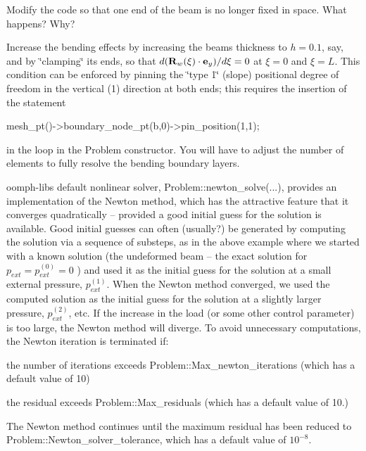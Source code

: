 \begin{DoxyEnumerate}
\item Modify the code so that one end of the beam is no longer fixed in space. What happens? Why?
\item Increase the bending effects by increasing the beam\textquotesingle{}s thickness to $ h=0.1 $, say, and by \char`\"{}clamping\char`\"{} its ends, so that $ d({\bf R}_w(\xi)\cdot {\bf e}_y)/d\xi = 0 $ at $ \xi=0 $ and $ \xi=L $. This condition can be enforced by pinning the \char`\"{}type 1\char`\"{} (slope) positional degree of freedom in the vertical (1) direction at both ends; this requires the insertion of the statement 
\begin{DoxyCode}
mesh\_pt()->boundary\_node\_pt(b,0)->pin\_position(1,1); 
\end{DoxyCode}
 in the loop in the {\ttfamily Problem} constructor. You will have to adjust the number of elements to fully resolve the bending boundary layers.
\item {\ttfamily oomph-\/lib\textquotesingle{}s} default\label{index_newton_cust}%
%
nonlinear solver, {\ttfamily Problem\+::newton\+\_\+solve}(...), provides an implementation of the Newton method, which has the attractive feature that it converges quadratically -- provided a good initial guess for the solution is available. Good initial guesses can often (usually?) be generated by computing the solution via a sequence of substeps, as in the above example where we started with a known solution (the undeformed beam -- the exact solution for $ p_{ext} = p_{ext}^{(0)} =0 $ ) and used it as the initial guess for the solution at a small external pressure, $ p_{ext}^{(1)} $. When the Newton method converged, we used the computed solution as the initial guess for the solution at a slightly larger pressure, $ p_{ext}^{(2)} $, etc. If the increase in the load (or some other control parameter) is too large, the Newton method will diverge. To avoid unnecessary computations, the Newton iteration is terminated if\+:
\begin{DoxyItemize}
\item the number of iterations exceeds {\ttfamily Problem\+::\+Max\+\_\+newton\+\_\+iterations} (which has a default value of 10)
\item the residual exceeds {\ttfamily Problem\+::\+Max\+\_\+residuals} (which has a default value of 10.)
\end{DoxyItemize}The Newton method continues until the maximum residual has been reduced to {\ttfamily Problem\+::\+Newton\+\_\+solver\+\_\+tolerance}, which has a default value of $ 10^{-8} $. ~\newline

\end{DoxyEnumerate}
